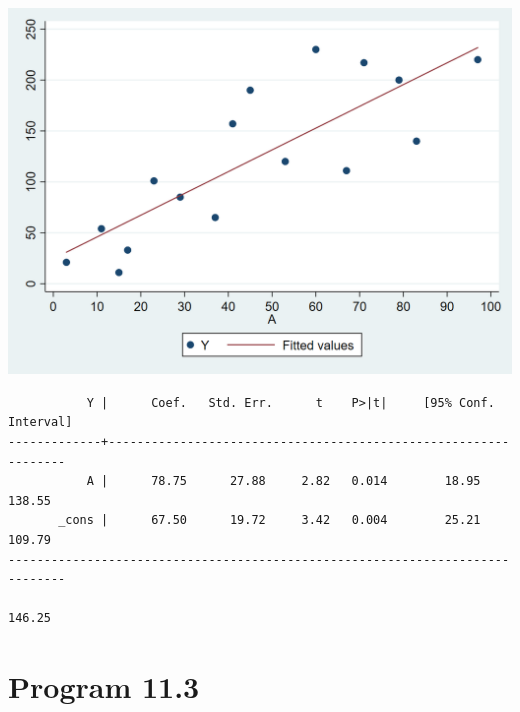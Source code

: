 \documentclass[
  10pt,
]{book}
\newenvironment{Shaded}{\begin{snugshade}}{\end{snugshade}}
\newcommand{\KeywordTok}[1]{\textcolor[rgb]{0.13,0.29,0.53}{\textbf{#1}}}
\newcommand{\NormalTok}[1]{#1}
\begin{document}
\begin{center}\includegraphics[width=0.85\linewidth]{figs/stata-fig-11-4} \end{center}

\begin{Shaded}
\end{Shaded}

\begin{verbatim}
           Y |      Coef.   Std. Err.      t    P>|t|     [95% Conf. Interval]
-------------+----------------------------------------------------------------
           A |      78.75      27.88     2.82   0.014        18.95      138.55
       _cons |      67.50      19.72     3.42   0.004        25.21      109.79
------------------------------------------------------------------------------

146.25
\end{verbatim}

\hypertarget{program-11.3}{%
\section{Program 11.3}\label{program-11.3}}
\end{document}
